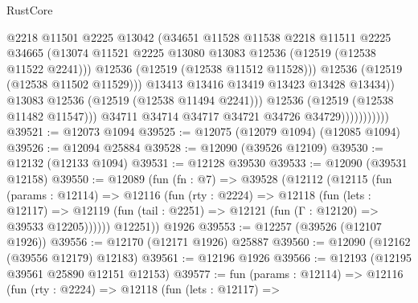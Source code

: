 \begin{lexlean}{RustCore}
\begin{coremodule}
                                    @2218
                                    @11501
                                    @2225
                                    @13042
                                    (@34651
                                      @11528
                                      @11538
                                      @2218
                                      @11511
                                      @2225
                                      @34665
                                      (@13074
                                        @11521
                                        @2225
                                        @13080
                                        @13083
                                        @12536
                                        (@12519 (@12538 @11522 @2241)))
                                      @12536
                                      (@12519 (@12538 @11512 @11528)))
                                    @12536
                                    (@12519 (@12538 @11502 @11529)))
                                  @13413
                                  @13416
                                  @13419
                                  @13423
                                  @13428
                                  @13434))
                              @13083
                              @12536
                              (@12519 (@12538 @11494 @2241)))
                            @12536
                            (@12519 (@12538 @11482 @11547)))
                          @34711
                          @34714
                          @34717
                          @34721
                          @34726
                          @34729)))))))))))
@39521 := @12073 @1094
@39525 := @12075 (@12079 @1094) (@12085 @1094)
@39526 := @12094 @25884
@39528 := @12090 (@39526 @12109)
@39530 := @12132 (@12133 @1094)
@39531 := @12128 @39530
@39533 := @12090 (@39531 @12158)
@39550 := @12089
    (fun (fn : @7) =>
    @39528
      (@12112
        (@12115
          (fun (params : @12114) =>
          @12116
            (fun (rty : @2224) =>
            @12118
              (fun (lets : @12117) =>
              @12119 (fun (tail : @2251) => @12121 (fun (Γ : @12120) => @39533 @12205))))))
        @12251))
    @1926
@39553 := @12257 (@39526 (@12107 @1926))
@39556 := @12170 (@12171 @1926) @25887
@39560 := @12090 (@12162 (@39556 @12179) @12183)
@39561 := @12196 @1926
@39566 := @12193 (@12195 @39561 @25890 @12151 @12153)
@39577 := fun (params : @12114) =>
  @12116
    (fun (rty : @2224) =>
    @12118
      (fun (lets : @12117) =>

\end{coremodule}
\end{lexlean}

